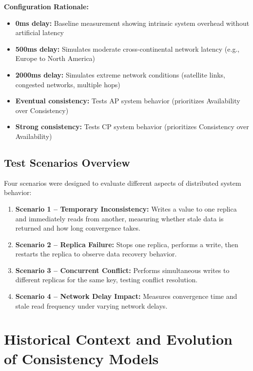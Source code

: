 \documentclass[10pt,a4paper]{article}
\begin{document}
\textbf{Configuration Rationale:}
\begin{itemize}
    \item \textbf{0ms delay:} Baseline measurement showing intrinsic system overhead without artificial latency
    \item \textbf{500ms delay:} Simulates moderate cross-continental network latency (e.g., Europe to North America)
    \item \textbf{2000ms delay:} Simulates extreme network conditions (satellite links, congested networks, multiple hops)
    \item \textbf{Eventual consistency:} Tests AP system behavior (prioritizes Availability over Consistency)
    \item \textbf{Strong consistency:} Tests CP system behavior (prioritizes Consistency over Availability)
\end{itemize}

\subsection{Test Scenarios Overview}

Four scenarios were designed to evaluate different aspects of distributed system behavior:

\begin{enumerate}
    \item \textbf{Scenario 1 -- Temporary Inconsistency:} Writes a value to one replica and immediately reads from another, measuring whether stale data is returned and how long convergence takes.
    \item \textbf{Scenario 2 -- Replica Failure:} Stops one replica, performs a write, then restarts the replica to observe data recovery behavior.
    \item \textbf{Scenario 3 -- Concurrent Conflict:} Performs simultaneous writes to different replicas for the same key, testing conflict resolution.
    \item \textbf{Scenario 4 -- Network Delay Impact:} Measures convergence time and stale read frequency under varying network delays.
\end{enumerate}

\newpage

\section{Historical Context and Evolution of Consistency Models}
\end{document}
